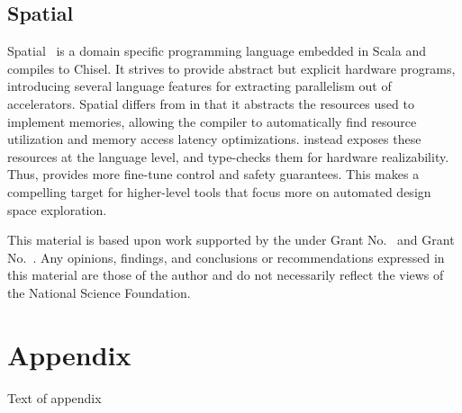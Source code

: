 \documentclass[acmsmall,review,anonymous]{acmart}\settopmatter{printfolios=true,printccs=false,printacmref=false}
\begin{document}
\subsection{Spatial}
Spatial~\cite{spatial} is a domain specific programming language embedded in Scala
and compiles to Chisel. It strives to provide abstract but explicit hardware programs,
introducing several language features for extracting parallelism out of accelerators. Spatial
differs from \sys{} in that it abstracts the resources used to implement memories, allowing
the compiler to automatically find resource utilization and memory access latency optimizations.
\sys{} instead exposes these resources at the language level, and type-checks them for hardware
realizability. Thus, \sys{} provides more fine-tune control and safety guarantees. This makes
\sys{} a compelling target for higher-level tools that focus more on automated design space
exploration.


\begin{acks}                            %
  This material is based upon work supported by the
   under Grant
  No.~ and Grant
  No.~.  Any opinions, findings, and
  conclusions or recommendations expressed in this material are those
  of the author and do not necessarily reflect the views of the
  National Science Foundation.
\end{acks}



\appendix
\section{Appendix}

Text of appendix
\end{document}
